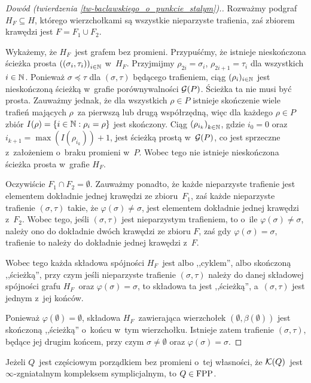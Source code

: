 \begin{proof}[Dowód (twierdzenia \ref{tw-baclawskiego_o_punkcie_stalym}).]
Rozważmy podgraf $H_F\subseteq H$, którego wierzchołkami są wszystkie nieparzyste trafienia, zaś zbiorem krawędzi jest $F=F_1\cup F_2$.

Wykażemy, że $H_F$~jest grafem bez promieni. Przypuśćmy, że istnieje nieskończona ścieżka prosta $\left((\sigma_i,\tau_i)\right)_{i\in\mathbb{N}}$ w~$H_F$. Przyjmijmy $\rho_{2i}=\sigma_i$, $\rho_{2i+1}=\tau_i$ dla wszystkich $i\in\mathbb{N}$. Ponieważ $\sigma\preceq \tau$ dla $(\sigma,\tau)$ będącego trafieniem, ciąg $(\rho_i)_{i\in\mathbb{N}}$ jest nieskończoną ścieżką w~grafie porównywalności $\mathcal{G}(P)$. Ścieżka ta nie musi być prosta. Zauważmy jednak, że dla wszystkich $\rho\in P$ istnieje skończenie wiele trafień mających $\rho$~za pierwszą lub drugą współrzędną, więc dla każdego $\rho\in P$ zbiór $I(\rho)=\{i\in\mathbb{N}:\rho_i=\rho\}$ jest skończony. Ciąg $\left(\rho_{i_k}\right)_{k\in\mathbb{N}}$, gdzie $i_0=0$ oraz $i_{k+1}=\max\left(I\left(\rho_{i_k}\right)\right)+1$, jest ścieżką prostą w~$\mathcal{G}(P)$, co jest sprzeczne z~założeniem o~braku promieni w~$P$.  Wobec tego nie istnieje nieskończona ścieżka prosta w~grafie $H_F$.

Oczywiście $F_1\cap F_2=\emptyset$. Zauważmy ponadto, że każde nieparzyste trafienie jest elementem dokładnie jednej krawędzi ze zbioru~$F_1$, zaś każde nieparzyste trafienie $(\sigma,\tau)$ takie, że $\varphi(\sigma)\not=\sigma$, jest elementem dokładnie jednej krawędzi z~$F_2$. Wobec tego, jeśli $(\sigma,\tau)$ jest nieparzystym trafieniem, to o~ile $\varphi(\sigma)\not=\sigma$, należy ono do dokładnie dwóch krawędzi ze zbioru $F$, zaś gdy $\varphi(\sigma)=\sigma$, trafienie to należy do dokładnie jednej krawędzi z~$F$. 

Wobec tego każda składowa spójności $H_F$~jest albo ,,cyklem'', albo skończoną ,,ścieżką'', przy czym jeśli nieparzyste trafienie $(\sigma,\tau)$ należy do danej składowej spójności grafu $H_F$~oraz $\varphi(\sigma)=\sigma$, to składowa ta jest ,,ścieżką'', a~$(\sigma,\tau)$ jest jednym z~jej końców. 

Ponieważ $\varphi(\emptyset)=\emptyset$, składowa $H_F$~zawierająca wierzchołek $(\emptyset,\beta(\emptyset))$ jest skończoną ,,ścieżką'' o~końcu w~tym wierzchołku. Istnieje zatem trafienie $(\sigma,\tau)$, będące jej drugim końcem, przy czym $\sigma\not=\emptyset$ oraz $\varphi(\sigma)=\sigma$.
\end{proof}

\begin{wn}\label{wn-baclawskiego_o_punkcie_stalym}
Jeżeli $Q$~jest częściowym porządkiem bez promieni o~tej własności, że $\mathcal{K}(Q)$~jest $\infty$-zgniatalnym kompleksem symplicjalnym, to $Q\in\mathrm{FPP}$.
\end{wn}

